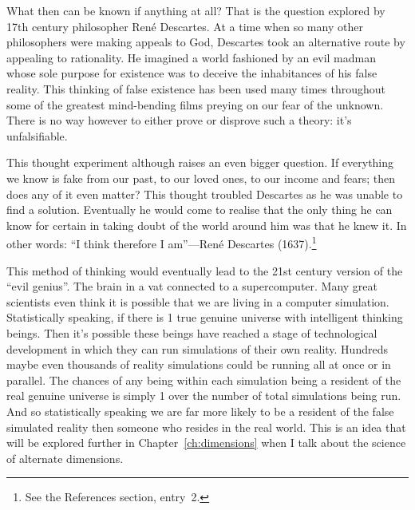 What then can be known if anything at all? That is the question explored by
17th century philosopher Ren\'e Descartes. At a time when so many other
philosophers were making appeals to God, Descartes took an alternative route by
appealing to rationality. He imagined a world fashioned by an evil madman whose
sole purpose for existence was to deceive the inhabitances of his false reality.
This thinking of false existence has been used many times throughout some of the
greatest mind-bending films preying on our fear of the unknown. There is no way
however to either prove or disprove such a theory: it's unfalsifiable.

This thought experiment although raises an even bigger question. If everything we
know is fake from our past, to our loved ones, to our income and fears; then does
any of it even matter? This thought troubled Descartes as he was unable to find a
solution. Eventually he would come to realise that the only thing he can know for
certain in taking doubt of the world around him was that he knew it. In other
words: ``I think therefore I am''---Ren\'e Descartes (1637).\footnote{See the
References section, entry~2.}

This method of thinking would eventually lead to the 21st century version of the
``evil genius''. The brain in a vat connected to a supercomputer. Many great
scientists even think it is possible that we are living in a computer simulation.
Statistically speaking, if there is 1 true genuine universe with intelligent
thinking beings. Then it's possible these beings have reached a stage of
technological development in which they can run simulations of their own reality.
Hundreds maybe even thousands of reality simulations could be running all at once
or in parallel. The chances of any being within each simulation being a resident
of the real genuine universe is simply 1 over the number of total simulations
being run. And so statistically speaking we are far more likely to be a resident
of the false simulated reality then someone who resides in the real world. This is
an idea that will be explored further in Chapter~\ref{ch:dimensions} when I talk
about the science of alternate dimensions.

